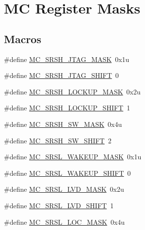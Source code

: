 \hypertarget{group___m_c___register___masks}{}\section{MC Register Masks}
\label{group___m_c___register___masks}
\subsection*{Macros}
\begin{DoxyCompactItemize}
\item 
\#define \hyperlink{group___m_c___register___masks_gab302a7877df83ec326673fa0ad86c610}{M\+C\+\_\+\+S\+R\+S\+H\+\_\+\+J\+T\+A\+G\+\_\+\+M\+A\+SK}~0x1u
\item 
\#define \hyperlink{group___m_c___register___masks_ga728d5942e5c66ff4ef86410f76f7bc71}{M\+C\+\_\+\+S\+R\+S\+H\+\_\+\+J\+T\+A\+G\+\_\+\+S\+H\+I\+FT}~0
\item 
\#define \hyperlink{group___m_c___register___masks_ga4ce0e16c7970230093885f7bda395886}{M\+C\+\_\+\+S\+R\+S\+H\+\_\+\+L\+O\+C\+K\+U\+P\+\_\+\+M\+A\+SK}~0x2u
\item 
\#define \hyperlink{group___m_c___register___masks_ga457b7a308d7c168c0c849944ca8bf5c1}{M\+C\+\_\+\+S\+R\+S\+H\+\_\+\+L\+O\+C\+K\+U\+P\+\_\+\+S\+H\+I\+FT}~1
\item 
\#define \hyperlink{group___m_c___register___masks_ga9e60169ace2f61deb3c4d133aab8ec4b}{M\+C\+\_\+\+S\+R\+S\+H\+\_\+\+S\+W\+\_\+\+M\+A\+SK}~0x4u
\item 
\#define \hyperlink{group___m_c___register___masks_ga99301ffac03d7da851f4a279b2e22da3}{M\+C\+\_\+\+S\+R\+S\+H\+\_\+\+S\+W\+\_\+\+S\+H\+I\+FT}~2
\item 
\#define \hyperlink{group___m_c___register___masks_ga323a86bca79f5495bfa8a4b230f37a35}{M\+C\+\_\+\+S\+R\+S\+L\+\_\+\+W\+A\+K\+E\+U\+P\+\_\+\+M\+A\+SK}~0x1u
\item 
\#define \hyperlink{group___m_c___register___masks_ga944f90f0cbd5d3480524ca17bfa0b9e2}{M\+C\+\_\+\+S\+R\+S\+L\+\_\+\+W\+A\+K\+E\+U\+P\+\_\+\+S\+H\+I\+FT}~0
\item 
\#define \hyperlink{group___m_c___register___masks_ga2915a9bef39090d3ccc81b948afea977}{M\+C\+\_\+\+S\+R\+S\+L\+\_\+\+L\+V\+D\+\_\+\+M\+A\+SK}~0x2u
\item 
\#define \hyperlink{group___m_c___register___masks_ga62c24e0534c073a31351d65272f78eaa}{M\+C\+\_\+\+S\+R\+S\+L\+\_\+\+L\+V\+D\+\_\+\+S\+H\+I\+FT}~1
\item 
\#define \hyperlink{group___m_c___register___masks_gabb3416a665d35c407d20a9c835f8f0bf}{M\+C\+\_\+\+S\+R\+S\+L\+\_\+\+L\+O\+C\+\_\+\+M\+A\+SK}~0x4u

\end{DoxyCompactItemize}
